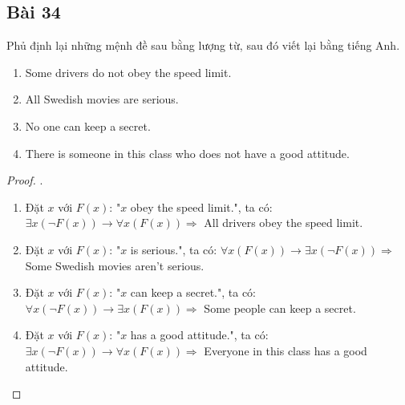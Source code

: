 \subsection*{Bài 34}
Phủ định lại những mệnh đề sau bằng lượng từ, sau đó viết lại bằng tiếng Anh.
\begin{enumerate}[label=\alph*)]
    \item Some drivers do not obey the speed limit.
    \item All Swedish movies are serious.
    \item No one can keep a secret.
    \item There is someone in this class who does not have a
    good attitude.
\end{enumerate}
\begin{proof}.
    \begin{enumerate}[label=\alph*)]
        \item Đặt $x$ với $F(x)$: "$x$ obey the speed limit.", ta có: $\exists x(\neg F(x))\rightarrow \forall x(F(x))\Rightarrow$ All drivers obey the speed limit.
        \item Đặt $x$ với $F(x)$: "$x$ is serious.", ta có: $\forall x(F(x))\rightarrow \exists x(\neg F(x))\Rightarrow$ Some Swedish movies aren't serious.
        \item Đặt $x$ với $F(x)$: "$x$ can keep a secret.", ta có: $\forall x(\neg F(x))\rightarrow \exists x(F(x))\Rightarrow$ Some people can keep a secret.
        \item Đặt $x$ với $F(x)$: "$x$ has a good attitude.", ta có: $\exists x(\neg F(x))\rightarrow \forall x(F(x))\Rightarrow$ Everyone in this class has a good attitude.
    \end{enumerate}
\end{proof}
